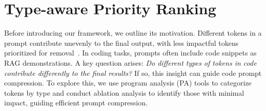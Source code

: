 \section{Type-aware Priority Ranking}\label{sec:ranking}


Before introducing our framework, we outline its motivation. Different tokens in a prompt contribute unevenly to the final output, with less impactful tokens prioritized for removal~\cite{lessismore,selective,llmlingua,longllmlingua,recomp}. In coding tasks, prompts often include code snippets as RAG demonstrations. A key question arises: \textit{Do different types of tokens in code contribute differently to the final results?} If so, this insight can guide code prompt compression. To explore this, we use program analysis (PA) tools to categorize tokens by type and conduct ablation analysis to identify those with minimal impact, guiding efficient prompt compression.




